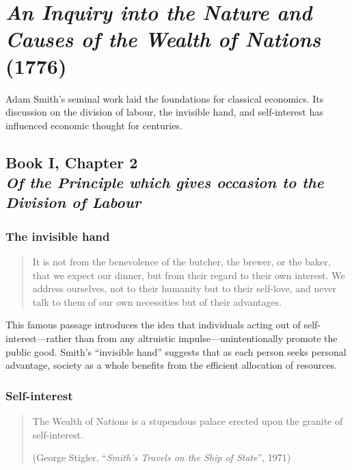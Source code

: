 \section[\textit{The Wealth of Nations} (1776)]{\textit{An Inquiry into the Nature and Causes of the Wealth of Nations} (1776)}

    Adam Smith’s seminal work laid the foundations for classical economics. Its discussion on the division of labour, the invisible hand, and self-interest has influenced economic thought for centuries.

    \subsection[Of the Principle which gives occasion to the Division of Labour]{Book I, Chapter 2 \\
                \textit{Of the Principle which gives occasion to the Division of Labour}}

        \subsubsection{The invisible hand}

            \begin{quote}
                It is not from the benevolence of the butcher, the brewer, or the baker, that we expect our dinner, but from their regard to their own interest. We address ourselves, not to their humanity but to their self-love, and never talk to them of our own necessities but of their advantages.
            \end{quote}

            This famous passage introduces the idea that individuals acting out of self-interest—rather than from any altruistic impulse—unintentionally promote the public good. Smith’s “invisible hand” suggests that as each person seeks personal advantage, society as a whole benefits from the efficient allocation of resources.

        \subsubsection{Self-interest}

            \begin{quote}
                The Wealth of Nations is a stupendous palace erected upon the granite of self-interest.

                (George Stigler, “\textit{Smith’s Travels on the Ship of State}”, 1971)
            \end{quote}

